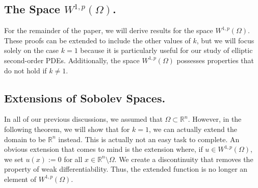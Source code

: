 \documentclass[10pt]{article}
\begin{document}
\subsection{The Space $W^{1,p}(\Omega)$.}

For the remainder of the paper, we will derive results for the space $W^{1,p}(\Omega)$. These proofs can be extended to include the other values of $k$, but we will focus solely on the case $k = 1$ because it is particularly useful for our study of elliptic second-order PDEs. Additionally, the space $W^{1,p}(\Omega)$ possesses properties that do not hold if $k \neq 1$. 
\subsection{Extensions of Sobolev Spaces.}
In all of our previous discussions, we assumed that $\Omega \subset \mathbb{R}^n$. However, in the following theorem, we will show that for $k = 1$, we can actually extend the domain to be $\mathbb{R}^n$ instead. This is actually not an easy task to complete. An obvious extension that comes to mind is the extension where, if $u \in W^{1,p}(\Omega)$, we set $u(x) := 0$ for all $x \in \mathbb{R}^n \setminus \Omega$. We create a discontinuity that removes the property of weak differentiability. Thus, the extended function is no longer an element of $W^{1,p}(\Omega)$. 
\end{document}
